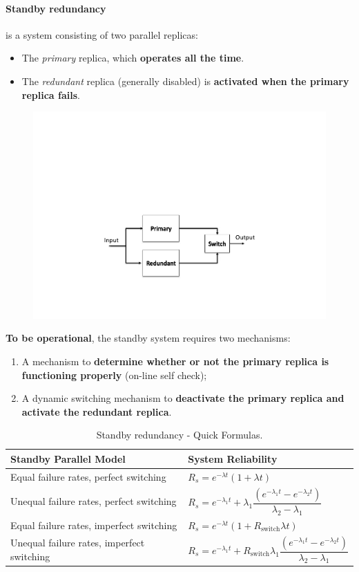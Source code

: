 \newpage

\paragraph{Standby redundancy}

 is a system consisting of two parallel replicas:
\begin{itemize}
	\item The \emph{primary} replica, which \textbf{operates all the time}.
	\item The \emph{redundant} replica (generally disabled) is \textbf{activated when the primary replica fails}.
\end{itemize}
\begin{figure}[!htp]
	\centering
	\includegraphics[width=.6\textwidth]{img/standby-redundancy-1.pdf}
\end{figure}

\noindent
\textbf{To be operational}, the standby system requires two mechanisms:
\begin{enumerate}
	\item A mechanism to \textbf{determine whether or not the primary replica is functioning properly} (on-line self check);
	\item A dynamic switching mechanism to \textbf{deactivate the primary replica and activate the redundant replica}.
\end{enumerate}

\begin{table}[!htp]
	\centering
	\begin{tabular}{@{} p{13em} | p{18em} @{}}
		\toprule
		\textbf{Standby Parallel Model} & \textbf{System Reliability} \\
		\midrule
		Equal failure rates, perfect switching & $R_{s} = e^{-\lambda t}\left(1 + \lambda t\right)$ \\
		Unequal failure rates, perfect switching & $R_{s} = e^{-\lambda_{1} t} + \lambda_{1} \dfrac{\left(e^{-\lambda_{1} t} - e^{-\lambda_{2} t}\right)}{\lambda_{2}-\lambda_{1}}$ \\
		Equal failure rates, imperfect switching & $R_{s} = e^{-\lambda t} \left(1 + R_{\text{switch}} \lambda t\right)$ \\
		Unequal failure rates, imperfect switching & $R_{s} = e^{-\lambda_{1} t} + R_{\text{switch}}\lambda_{1} \dfrac{\left(e^{-\lambda_{1} t} - e^{-\lambda_{2} t}\right)}{\lambda_{2} - \lambda_{1}}$ \\
		\bottomrule
	\end{tabular}
	\caption{Standby redundancy - Quick Formulas.}
\end{table}

